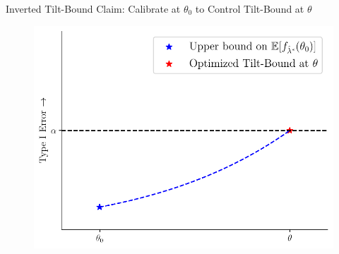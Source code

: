 \begin{frame}{Inverted Tilt-Bound}
Claim: Calibrate at $\theta_0$ to Control Tilt-Bound at $\theta$
\begin{figure}
    \centering
    \includegraphics[width=0.9\linewidth]{figs/calibration_tile_solution.pdf}
\end{figure} 
\end{frame}


